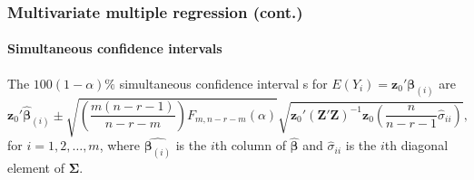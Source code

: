 \documentclass{beamer}
\begin{document}
	\begin{frame}
		\frametitle{Multivariate multiple regression (cont.)}
		\framesubtitle{Simultaneous confidence intervals}
		The $100( 1 - \alpha )\%$ simultaneous confidence interval s for $E( Y_i ) = \pmb{z}_0' \pmb{ \beta }_{ ( i ) }$ are 
		\begin{equation*}
			\pmb{ z }_0' \hat{ \pmb{ \beta } }_{ ( i ) } \pm \sqrt{ \left( \frac{ m( n - r - 1 ) }{ n - r - m } \right) F_{ m, n - r - m }( \alpha ) } \sqrt{ \pmb{ z }_0'( \pmb{ Z }' \pmb{ Z } ) ^ { -1 } \pmb{ z }_0 \left( \frac{ n }{ n - r - 1 } \hat{ \sigma }_{ ii } \right) },
		\end{equation*}
		for $i = 1, 2, \dots, m$, where $\hat{ \pmb{ \beta }_{ ( i ) } }$ is the $i$th column of $\hat{ \pmb{ \beta } }$ and $\hat{ \sigma }_{ ii }$ is the $i$th diagonal element of $\pmb{ \Sigma }$.
		
	\end{frame}

	\begin{frame}[allowframebreaks]
		\begin{singlespace}
			
			
		\end{singlespace}
	\end{frame}
\end{document}
